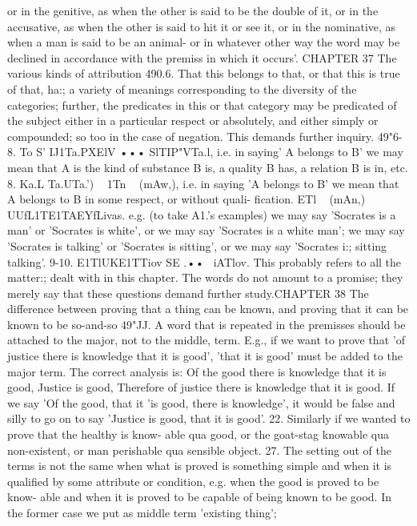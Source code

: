 {{{{{{{{{{{{{{{{{{{{{{{{{{{{or in the genitive, as when the other is said to be the double of
it, or in the accusative, as when the other is said to hit it or see
it, or in the nominative, as when a man is said to be an animal-
or in whatever other way the word may be declined in accordance
with the premiss in which it occurs'.
CHAPTER 37
The various kinds of attribution
490.6. That this belongs to that, or that this is true of that, ha:;
a variety of meanings corresponding to the diversity of the
categories; further, the predicates in this or that category may
be predicated of the subject either in a particular respect or
absolutely, and either simply or compounded; so too in the case
of negation. This demands further inquiry.
49"6-8. To S' IJ1Ta.PXElV ••• SlTIP"VTa.l, i.e. in saying' A belongs
to B' we may mean that A is the kind of substance B is, a quality
B has, a relation B is in, etc.
8. Ka.L Ta.UTa.') ~ 1Tn ~ (mAw,), i.e. in saying 'A belongs to B'
we mean that A belongs to B in some respect, or without quali-
fication.
ETl ~ (mAn,) ~ UUfL1TE1TAEYfLivas. e.g. (to take A1.'s examples)
we may say 'Socrates is a man' or 'Socrates is white', or we may
say 'Socrates is a white man'; we may say 'Socrates is talking' or
'Socrates is sitting', or we may say 'Socrates i:; sitting talking'.
9-10. E1TlUKE1TTiov SE .•• ~iATlov. This probably refers to all
the matter:; dealt with in this chapter. The words do not amount
to a promise; they merely say that these questions demand
further study.CHAPTER 38
The difference between proving that a thing can be known, and
proving that it can be known to be so-and-so
49"JJ. A word that is repeated in the premisses should be
attached to the major, not to the middle, term. E.g., if we want
to prove that 'of justice there is knowledge that it is good', 'that
it is good' must be added to the major term. The correct analysis
is: Of the good there is knowledge that it is good, Justice is good,
Therefore of justice there is knowledge that it is good. If we say
'Of the good, that it 'is good, there is knowledge', it would be
false and silly to go on to say 'Justice is good, that it is good'.
22. Similarly if we wanted to prove that the healthy is know-
able qua good, or the goat-stag knowable qua non-existent, or man
perishable qua sensible object.
27. The setting out of the terms is not the same when what is
proved is something simple and when it is qualified by some
attribute or condition, e.g. when the good is proved to be know-
able and when it is proved to be capable of being known to be
good. In the former case we put as middle term 'existing thing';
}}}}}}}}}}}}}}}}}}}}}}}}}}}}
